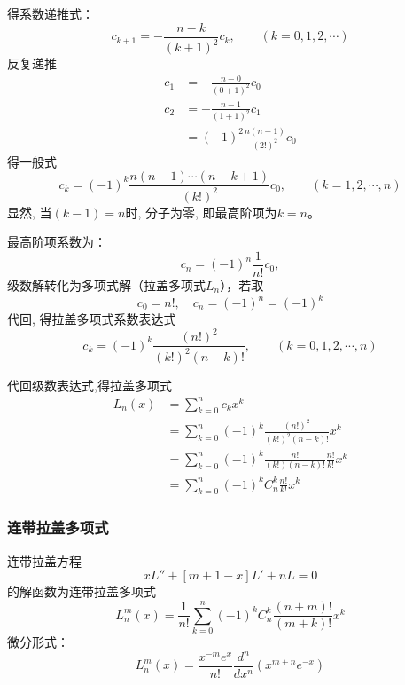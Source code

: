 \begin{frame}
得系数递推式：
\begin{equation*}
  c_{k+1}=-\frac{n-k}{(k+1)^2} c_k, \qquad (k=0,1,2,\cdots)
\end{equation*}	
反复递推
\begin{equation*}
  \begin{aligned}
    c_{1} &=-\frac{n-0}{(0+1)^2} c_0 \\ 
    c_{2} &=-\frac{n-1}{(1+1)^2} c_1 \\ 
    &= (-1)^2\frac{n(n-1)}{(2!)^2} c_0
  \end{aligned}
\end{equation*}
得一般式
\begin{equation*}
  c_{k}=(-1)^k \frac{n(n-1)\cdots (n-k+1)}{(k!)^2} c_0, \qquad (k=1,2,\cdots, n)
\end{equation*}	
显然, 当$(k-1) = n$时, 分子为零, 即最高阶项为$k=n$。
\end{frame}	

\begin{frame}
最高阶项系数为：
\begin{equation*}
  c_{n}=(-1)^n \frac{1}{n!} c_0, 
\end{equation*}	
级数解转化为多项式解（拉盖多项式$L_n$），若取
\begin{equation*}
  c_{0}=n!, \quad  c_{n}=(-1)^n = (-1)^k 
\end{equation*}	
代回, 得拉盖多项式系数表达式
\begin{equation*}
  c_{k}=(-1)^k \frac{(n!) ^2}{(k!)^2 (n-k)!},  \qquad (k=0,1,2,\cdots, n)
\end{equation*}	
\end{frame}	

\begin{frame}
代回级数表达式,得拉盖多项式
\begin{equation*}
\begin{split}
  L_n(x) &=\sum_{k=0}^{n} c_{k} x^k \\
  &= \sum_{k=0}^{n} (-1)^k \frac{(n!)^2 }{(k!)^2 (n-k)!}x^k \\
  &= \sum_{k=0}^{n} (-1)^k \frac{n! }{(k!) (n-k)!} \frac{n!}{k!}x^k   \\
  &= \sum_{k=0}^{n} (-1)^k C^k _n \frac{n!}{k!}x^k
\end{split}		
\end{equation*}	
\end{frame}	

\begin{frame}
\frametitle{连带拉盖多项式}
连带拉盖方程
\begin{equation*}
x L''  + [m+1 -x] L' +n L =0
\end{equation*}	
的解函数为连带拉盖多项式
\begin{equation*}
  L^m _n (x)= \frac{1} {n!}  \sum_{k=0}^{n} (-1)^k C^k _n \frac{(n+m)!}{(m+k)!}x^k
\end{equation*}	
微分形式： 
\begin{equation*}
  L^m _n(x) =\frac{x^{-m}e^x  }{n!} \frac{d ^n}{d x^n} (x^{m+n} e^{-x})
\end{equation*}	
\end{frame}		

